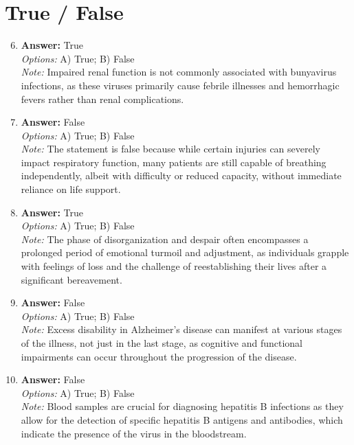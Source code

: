 \documentclass[12pt]{article}
\begin{document}
\section*{True / False}
\begin{enumerate}[label=\arabic*.]
\setcounter{enumi}{5}
\item \textbf{Answer:} True
\\ \textit{Options:} A) True; B) False
\\ \textit{Note:} Impaired renal function is not commonly associated with bunyavirus infections, as these viruses primarily cause febrile illnesses and hemorrhagic fevers rather than renal complications.
\item \textbf{Answer:} False
\\ \textit{Options:} A) True; B) False
\\ \textit{Note:} The statement is false because while certain injuries can severely impact respiratory function, many patients are still capable of breathing independently, albeit with difficulty or reduced capacity, without immediate reliance on life support.
\item \textbf{Answer:} True
\\ \textit{Options:} A) True; B) False
\\ \textit{Note:} The phase of disorganization and despair often encompasses a prolonged period of emotional turmoil and adjustment, as individuals grapple with feelings of loss and the challenge of reestablishing their lives after a significant bereavement.
\item \textbf{Answer:} False
\\ \textit{Options:} A) True; B) False
\\ \textit{Note:} Excess disability in Alzheimer's disease can manifest at various stages of the illness, not just in the last stage, as cognitive and functional impairments can occur throughout the progression of the disease.
\item \textbf{Answer:} False
\\ \textit{Options:} A) True; B) False
\\ \textit{Note:} Blood samples are crucial for diagnosing hepatitis B infections as they allow for the detection of specific hepatitis B antigens and antibodies, which indicate the presence of the virus in the bloodstream.
\end{enumerate}
\end{document}

